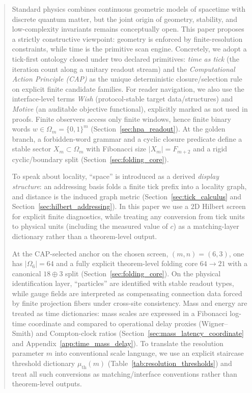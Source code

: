 
\begin{abstract}
Standard physics combines continuous geometric models of spacetime with discrete quantum matter, but the joint origin of geometry, stability, and low-complexity invariants remains conceptually open.
This paper proposes a strictly constructive viewpoint: geometry is enforced by finite-resolution constraints, while time is the primitive scan engine.
Concretely, we adopt a tick-first ontology closed under two declared primitives: \emph{time as tick} (the iteration count along a unitary readout stream) and the \emph{Computational Action Principle (CAP)} as the unique deterministic closure/selection rule on explicit finite candidate families.
For reader navigation, we also use the interface-level terms \emph{Wish} (protocol-stable target data/structures) and \emph{Motive} (an auditable objective functional), explicitly marked as \AuditTag not used in proofs.
Finite observers access only finite windows, hence finite binary words $w\in\Omega_m=\{0,1\}^m$ (Section~\ref{sec:hpa_readout}).
At the golden branch, a forbidden-word grammar and a cyclic closure predicate define a stable sector $X_m\subset\Omega_m$ with Fibonacci size $|X_m|=F_{m+2}$ and a rigid cyclic/boundary split (Section~\ref{sec:folding_core}).

To speak about locality, ``space'' is introduced as a derived \emph{display structure}: an addressing basis folds a finite tick prefix into a locality graph, and distance is the induced graph metric (Section~\ref{sec:tick_calculus} and Section~\ref{sec:hilbert_addressing}).
In this paper we use a $2$D Hilbert screen for explicit finite diagnostics, while treating any conversion from tick units to physical units (including the measured value of $c$) as a matching-layer dictionary rather than a theorem-level output.

At the CAP-selected anchor on the chosen screen, $(m,n)=(6,3)$, one has $|\Omega_6|=64$ and a fully explicit theorem-level folding core $64\to 21$ with a canonical $18\oplus 3$ split (Section~\ref{sec:folding_core}).
On the physical identification layer, ``particles'' are identified with stable readout types, while gauge fields are interpreted as compensating connection data forced by finite projection fibers under cross-site consistency.
Mass and energy are treated as time dictionaries: mass scales are expressed in a Fibonacci log-time coordinate and compared to operational delay proxies (Wigner--Smith) and Compton-clock ratios (Section~\ref{sec:mass_latency_coordinate} and Appendix~\ref{app:time_mass_delay}).
To translate the resolution parameter $m$ into conventional scale language, we use an explicit staircase threshold dictionary $\mu_{\mathrm{th}}(m)$ (Table~\ref{tab:resolution_thresholds}) and treat all such conversions as matching/interface conventions rather than theorem-level outputs.


\end{abstract}
